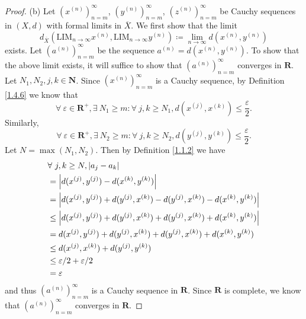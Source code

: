 \begin{proof}{(b)}
    Let \((x^{(n)})_{n = m}^\infty\), \((y^{(n)})_{n = m}^\infty\), \((z^{(n)})_{n = m}^\infty\) be Cauchy sequences in \((X, d)\) with formal limits in \(\overline{X}\).
    We first show that the limit
    \[
        d_{\overline{X}}(\text{LIM}_{n \to \infty} x^{(n)}, \text{LIM}_{n \to \infty} y^{(n)}) \coloneqq \lim_{n \to \infty} d(x^{(n)}, y^{(n)})
    \]
    exists.
    Let \((a^{(n)})_{n = m}^\infty\) be the sequence \(a^{(n)} = d(x^{(n)}, y^{(n)})\).
    To show that the above limit exists, it will suffice to show that \((a^{(n)})_{n = m}^\infty\) converges in \(\mathbf{R}\).
    Let \(N_1, N_2, j, k \in \mathbf{N}\).
    Since \((x^{(n)})_{n = m}^\infty\) is a Cauchy sequence, by Definition \ref{1.4.6} we know that
    \[
        \forall\ \varepsilon \in \mathbf{R}^+, \exists\ N_1 \geq m : \forall\ j, k \geq N_1, d(x^{(j)}, x^{(k)}) \leq \frac{\varepsilon}{2}.
    \]
    Similarly,
    \[
        \forall\ \varepsilon \in \mathbf{R}^+, \exists\ N_2 \geq m : \forall\ j, k \geq N_2, d(y^{(j)}, y^{(k)}) \leq \frac{\varepsilon}{2}.
    \]
    Let \(N = \max(N_1, N_2)\).
    Then by Definition \ref{1.1.2} we have
    \begin{align*}
         & \forall\ j, k \geq N, \abs*{a_j - a_k}                                                            \\
         & = \abs*{d(x^{(j)}, y^{(j)}) - d(x^{(k)}, y^{(k)})}                                                \\
         & = \abs*{d(x^{(j)}, y^{(j)}) + d(y^{(j)}, x^{(k)}) - d(y^{(j)}, x^{(k)}) - d(x^{(k)}, y^{(k)})}    \\
         & \leq \abs*{d(x^{(j)}, y^{(j)}) + d(y^{(j)}, x^{(k)}) + d(y^{(j)}, x^{(k)}) + d(x^{(k)}, y^{(k)})} \\
         & = d(x^{(j)}, y^{(j)}) + d(y^{(j)}, x^{(k)}) + d(y^{(j)}, x^{(k)}) + d(x^{(k)}, y^{(k)})           \\
         & \leq d(x^{(j)}, x^{(k)}) + d(y^{(j)}, y^{(k)})                                                    \\
         & \leq \varepsilon / 2 + \varepsilon / 2                                                            \\
         & = \varepsilon
    \end{align*}
    and thus \((a^{(n)})_{n = m}^\infty\) is a Cauchy sequence in \(\mathbf{R}\).
    Since \(\mathbf{R}\) is complete, we know that \((a^{(n)})_{n = m}^\infty\) converges in \(\mathbf{R}\).


\end{proof}
